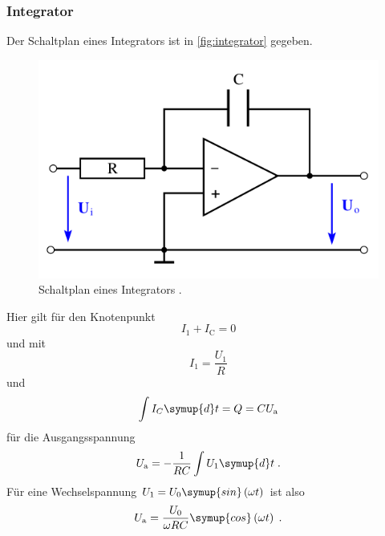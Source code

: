 \subsubsection{Integrator}
Der Schaltplan eines Integrators ist in \autoref{fig:integrator} gegeben.
\begin{figure}
    \centering
    \includegraphics[width = .5\textwidth]{"content/pics/integrator.png"}
    \caption{Schaltplan eines Integrators \cite{v51}.}
    \label{fig:integrator}
\end{figure}
Hier gilt für den Knotenpunkt 
\begin{equation*}
    I_1 + I_\text{C} = 0
\end{equation*}
und mit  
\begin{equation*}
    I_1 = \frac{U_1}{R}
\end{equation*}
und 
\begin{equation*}
    \int I_C \symup{d}t = Q = CU_\text{a}
\end{equation*}
für die Ausgangsspannung 
\begin{equation}
    U_\text{a} = -\frac{1}{RC} \int U_1 \symup{d}t \;.
    \label{eq:integrator1}
\end{equation}
Für eine Wechselspannung $U_1 = U_0 \symup{sin}\left(\omega t\right)$ ist also 
\begin{equation}
    U_\text{a} = \frac{U_0}{\omega RC} \symup{cos}\left(\omega t\right) \;.
    \label{eq:integrator2}
\end{equation}

